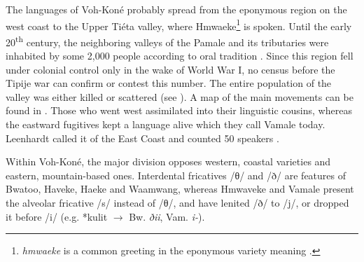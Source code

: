The languages of Voh-Koné probably spread from the eponymous region on the west coast to the Upper Tiéta valley, where Hmwaeke\footnote{\textit{hmwaeke} is a common greeting in the eponymous variety meaning .} is spoken. Until the early 20\textsuperscript{th} century, the neighboring valleys of the Pamale and its tributaries were inhabited by some 2,000 people according to oral tradition \parencite[62]{couhia_pascal_2008}. Since this region fell under colonial control only in the wake of World War I, no census before the Tipije war can confirm or contest this number. The entire population of the valley was either killed or scattered (see ). A map of the main movements can be found in . Those who went west assimilated into their linguistic cousins, whereas the eastward fugitives kept a language alive which they call Vamale today. Leenhardt called it  of the East Coast and counted 50 speakers \parencite[162]{leenhardt_langues_1946}.





\begin{sloppypar}
Within Voh-Koné, the major division opposes western, coastal varieties and eastern, mountain-based ones.
Interdental fricatives /θ/ and /ð/ are features of Bwatoo, Haveke, Haeke and Waamwang, whereas Hmwaveke and Vamale present the alveolar fricative /s/ instead of /θ/, and have lenited /ð/ to /j/, or dropped it before /i/ (e.g. *kulit  $\rightarrow$ Bw. \textit{ðii}, Vam. \textit{i-}).
\end{sloppypar}

